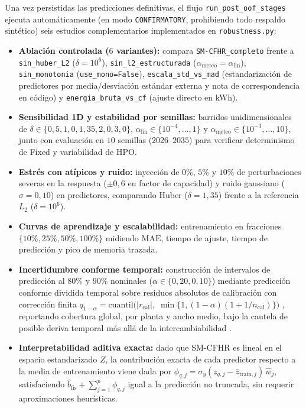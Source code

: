 Una vez persistidas las predicciones definitivas, el flujo \texttt{run\_post\_oof\_stages} ejecuta automáticamente (en modo \texttt{CONFIRMATORY}, prohibiendo todo respaldo sintético) seis estudios complementarios implementados en \texttt{robustness.py}:
\begin{itemize}
    \item \textbf{Ablación controlada ($6$ variantes):} compara \texttt{SM-CFHR\_completo} frente a \texttt{sin\_huber\_L2} ($\delta = 10^6$), \texttt{sin\_l2\_estructurada} ($\alpha_{\mathrm{meteo}} = \alpha_{\mathrm{lin}}$), \texttt{sin\_monotonia} (\texttt{use\_mono=False}), \texttt{escala\_std\_vs\_mad} (estandarización de predictores por media/desviación estándar externa y nota de correspondencia en código) y \texttt{energia\_bruta\_vs\_cf} (ajuste directo en kWh).
    \item \textbf{Sensibilidad 1D y estabilidad por semillas:} barridos unidimensionales de $\delta \in \{0{,}5, 1{,}0, 1{,}35, 2{,}0, 3{,}0\}$, $\alpha_{\mathrm{lin}} \in \{10^{-4},\dots,1\}$ y $\alpha_{\mathrm{meteo}} \in \{10^{-3},\dots,10\}$, junto con evaluación en $10$ semillas ($2026$--$2035$) para verificar determinismo de Fixed y variabilidad de HPO.
    \item \textbf{Estrés con atípicos y ruido:} inyección de $0\%$, $5\%$ y $10\%$ de perturbaciones severas en la respuesta ($\pm 0{,}6$ en factor de capacidad) y ruido gaussiano ($\sigma = 0{,}10$) en predictores, comparando Huber ($\delta=1{,}35$) frente a la referencia $L_2$ ($\delta=10^6$).
    \item \textbf{Curvas de aprendizaje y escalabilidad:} entrenamiento en fracciones $\{10\%, 25\%, 50\%, 100\%\}$ midiendo $\mathrm{MAE}$, tiempo de ajuste, tiempo de predicción y pico de memoria trazada.
    \item \textbf{Incertidumbre conforme temporal:} construcción de intervalos de predicción al $80\%$ y $90\%$ nominales ($\alpha \in \{0{,}20, 0{,}10\}$) mediante predicción conforme dividida temporal sobre residuos absolutos de calibración con corrección finita $q_{1-\alpha} = \mathrm{cuantil}\big(|r_{\mathrm{cal}}|,\; \min\{1, (1-\alpha)(1+1/n_{\mathrm{cal}})\}\big)$ \cite{vovk2005conformal,lei2018conformal}, reportando cobertura global, por planta y ancho medio, bajo la cautela de posible deriva temporal más allá de la intercambiabilidad \cite{barber2023nonexchangeable}.
    \item \textbf{Interpretabilidad aditiva exacta:} dado que SM-CFHR es lineal en el espacio estandarizado $Z$, la contribución exacta de cada predictor respecto a la media de entrenamiento viene dada por $\phi_{q,j} = \sigma_y (z_{q,j} - \bar{z}_{\mathrm{train},j})\,\hat{w}_j$, satisfaciendo $\hat{b}_{\mathrm{fis}} + \sum_{j=1}^p \phi_{q,j}$ igual a la predicción no truncada, sin requerir aproximaciones heurísticas.
\end{itemize}
